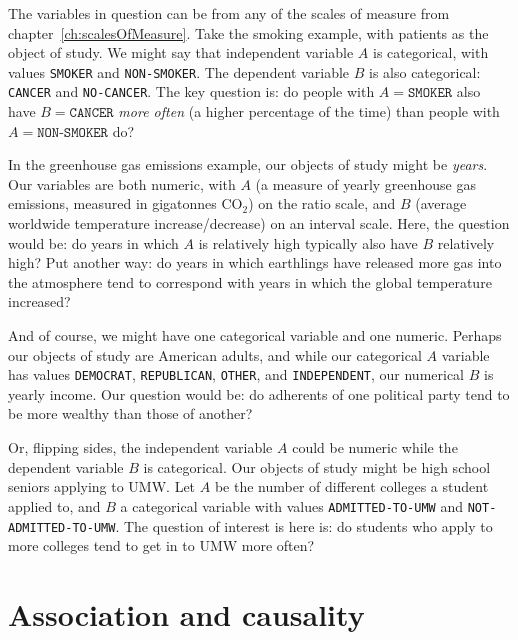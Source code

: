 
The variables in question can be from any of the scales of measure from
chapter~\ref{ch:scalesOfMeasure}. Take the smoking example, with patients as
the object of study. We might say that independent variable $A$ is categorical,
with values \texttt{SMOKER} and \texttt{NON-SMOKER}. The dependent variable $B$
is also categorical: \texttt{CANCER} and \texttt{NO-CANCER}. The key question
is: do people with $A=\texttt{SMOKER}$ also have $B=\texttt{CANCER}$
\textit{more often} (a higher percentage of the time) than people with
$A=\texttt{NON-SMOKER}$ do?


In the greenhouse gas emissions example, our objects of study might be
\textit{years}. Our variables are both numeric, with $A$ (a measure of yearly
greenhouse gas emissions, measured in gigatonnes $\textrm{CO}_2$) on the ratio
scale, and $B$ (average worldwide temperature increase/decrease) on an interval
scale. Here, the question would be: do years in which $A$ is relatively high
typically also have $B$ relatively high? Put another way: do years in which
earthlings have released more gas into the atmosphere tend to correspond with
years in which the global temperature increased?

And of course, we might have one categorical variable and one numeric. Perhaps
our objects of study are American adults, and while our categorical $A$
variable has values \texttt{DEMOCRAT}, \texttt{REPUBLICAN}, \texttt{OTHER}, and
\texttt{INDEPENDENT}, our numerical $B$ is yearly income. Our question would
be: do adherents of one political party tend to be more wealthy than those of
another?

Or, flipping sides, the independent variable $A$ could be numeric while the
dependent variable $B$ is categorical. Our objects of study might be high
school seniors applying to UMW. Let $A$ be the number of different colleges a
student applied to, and $B$ a categorical variable with values
\texttt{ADMITTED-TO-UMW} and \texttt{NOT-ADMITTED-TO-UMW}. The question of
interest is here is: do students who apply to more colleges tend to get in to
UMW more often?

\section{Association and causality}

\label{association}

